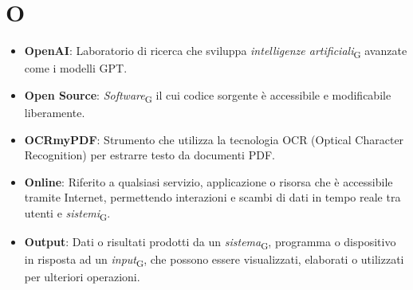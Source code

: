 \section{O}
\begin{itemize}
    \item \textbf{OpenAI}: Laboratorio di ricerca che sviluppa \textit{intelligenze artificiali}\textsubscript{G} avanzate come i modelli GPT.
    \item \textbf{Open Source}: \textit{Software}\textsubscript{G} il cui codice sorgente è accessibile e modificabile liberamente.
    \item \textbf{OCRmyPDF}: Strumento che utilizza la tecnologia OCR (Optical Character Recognition) per estrarre testo da documenti PDF.
    \item \textbf{Online}: Riferito a qualsiasi servizio, applicazione o risorsa che è accessibile tramite Internet, permettendo interazioni e scambi di dati in tempo reale tra utenti e \textit{sistemi}\textsubscript{G}.
    \item \textbf{Output}: Dati o risultati prodotti da un \textit{sistema}\textsubscript{G}, programma o dispositivo in risposta ad un \textit{input}\textsubscript{G}, che possono essere visualizzati, elaborati o utilizzati per ulteriori operazioni.
\end{itemize}
